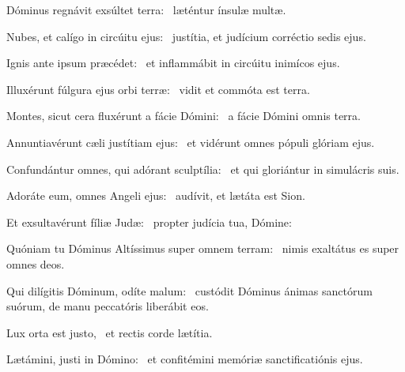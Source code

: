 \item Dóminus regnávit exsúltet terra:~\psstar{} læténtur ínsulæ multæ.

\item Nubes, et calígo in circúitu ejus:~\psstar{} justítia, et judícium corréctio sedis ejus.

\item Ignis ante ipsum præcédet:~\psstar{} et inflammábit in circúitu inimícos ejus.

\item Illuxérunt fúlgura ejus orbi terræ:~\psstar{} vidit et commóta est terra.

\item Montes, sicut cera fluxérunt a fácie Dómini:~\psstar{} a fácie Dómini omnis terra.

\item Annuntiavérunt cæli justítiam ejus:~\psstar{} et vidérunt omnes pópuli glóriam ejus.

\item Confundántur omnes, qui adórant sculptília:~\psstar{} et qui gloriántur in simulácris suis.

\item Adoráte eum, omnes Angeli ejus:~\psstar{} audívit, et lætáta est Sion.

\item Et exsultavérunt fíliæ Judæ:~\psstar{} propter judícia tua, Dómine:

\item Quóniam tu Dóminus Altíssimus super omnem terram:~\psstar{} nimis exaltátus es super omnes deos.

\item Qui dilígitis Dóminum, odíte malum:~\psstar{} custódit Dóminus ánimas sanctórum suórum, de manu peccatóris liberábit eos.

\item Lux orta est justo,~\psstar{} et rectis corde lætítia.

\item Lætámini, justi in Dómino:~\psstar{} et confitémini memóriæ sanctificatiónis ejus.
